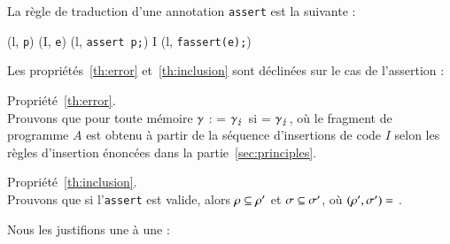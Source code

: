 La règle de traduction d'une annotation \lstinline'assert' est la suivante :

\begin{center}
{
  {(l, \mbox{\lstinline'p'})  (I, \mbox{\lstinline'e'})}
  {(l, \mbox{\lstinline'assert p;'})
     I \concat (l, \mbox{\lstinline'fassert(e);'})}{}
}
\end{center}

Les propriétés~\ref{th:error} et~\ref{th:inclusion} sont déclinées sur le cas
de l'assertion :

Propriété~\ref{th:error}.\\
Prouvons que pour toute mémoire $\gamma$ :
 = $\gamma_\lightning$
si  = $\gamma_\lightning$,
où le fragment de programme $A$ est obtenu à partir de la séquence d'insertions
de code $I$ selon les règles d'insertion énoncées dans la
partie~\ref{sec:principles}.

Propriété~\ref{th:inclusion}.\\
Prouvons que si l'\lstinline'assert' est valide, alors
$\rho \subseteq \rho'$ et $\sigma \subseteq \sigma'$, où $(\rho', \sigma') =$
.

Nous les justifions une à une :

